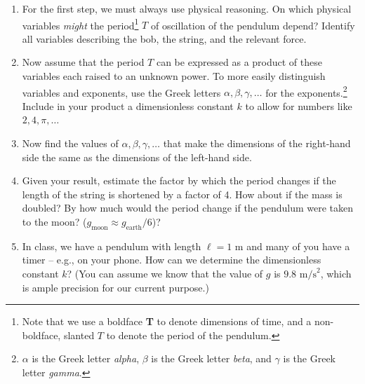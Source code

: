 \documentclass[11pt, letterpaper, openany]{book}
\newenvironment{exercise}[1][Exercise]{%
  \tcolorbox[blanker, breakable, left=1em,
    before skip=1em, after skip=1em,
    borderline west={3pt}{0pt}{PhysNavy},
    colback=PhysCream,
    before upper={\textcolor{PhysNavy}{\sffamily\bfseries #1:}\space}
  ]%
}{%
  \endtcolorbox%
}
\begin{document}
\begin{exercise}[Exercise 4]
\begin{enumerate}[label=(\alph*)]
    \item For the first step, we must always use physical reasoning. On which physical variables \textit{might} the period\footnote{Note that we use a boldface \textbf{T} to denote dimensions of time, and a non-boldface, slanted $T$ to denote the period of the pendulum.} $T$ of oscillation of the pendulum depend? Identify all variables describing the bob, the string, and the relevant force.
    \item Now assume that the period $T$ can be expressed as a product of these variables each raised to an unknown power. To more easily distinguish variables and exponents, use the Greek letters $\alpha, \beta, \gamma, \dots$ for the exponents.\footnote{$\alpha$ is the Greek letter \textit{alpha}, $\beta$ is the Greek letter \textit{beta}, and $\gamma$ is the Greek letter \textit{gamma}.} Include in your product a dimensionless constant $k$ to allow for numbers like $2, 4, \pi, \dots$
    \item Now find the values of $\alpha, \beta, \gamma, \dots$ that make the dimensions of the right-hand side the same as the dimensions of the left-hand side.
    \item Given your result, estimate the factor by which the period changes if the length of the string is shortened by a factor of 4. How about if the mass is doubled? By how much would the period change if the pendulum were taken to the moon? ($g_{\text{moon}} \approx g_{\text{earth}}/6$)?
    \item In class, we have a pendulum with length $\ell = 1$ m and many of you have a timer -- e.g., on your phone. How can we determine the dimensionless constant $k$? (You can assume we know that the value of $g$ is $9.8\text{ m/s}^2$, which is ample precision for our current purpose.)
\end{enumerate}
\end{exercise}
\end{document}
